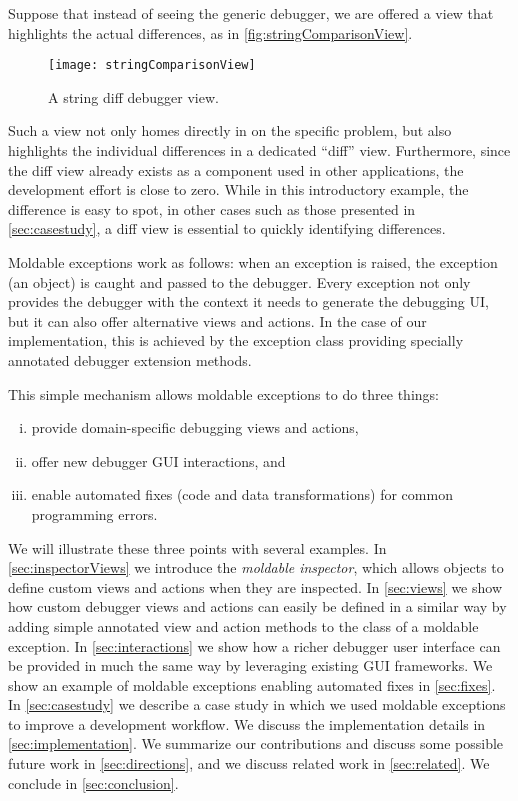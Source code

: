 \documentclass[sigplan,screen]{acmart} %
\begin{document}
Suppose that instead of seeing the generic debugger, we are offered a view that highlights the actual differences, as in \autoref{fig:stringComparisonView}.
\begin{figure}[h]
  \texttt{[image: stringComparisonView]}
  \caption{A string diff debugger view.}
  \label{fig:stringComparisonView}
\end{figure}
Such a view not only homes directly in on the specific problem, but also highlights the individual differences in a dedicated ``diff'' view.
Furthermore, since the diff view already exists as a component used in other applications, the development effort is close to zero.
While in this introductory example, the difference is easy to spot, in other cases such as those presented in \autoref{sec:casestudy}, a diff view is essential to quickly identifying differences.

Moldable exceptions work as follows: when an exception is raised, the exception (an object) is caught and passed to the debugger.
Every exception not only provides the debugger with the context it needs to generate the debugging UI, but it can also offer alternative views and actions.
In the case of our implementation, this is achieved by the exception class providing specially annotated debugger extension methods.

This simple mechanism allows moldable exceptions to do three things:
\begin{enumerate}[(i)]
	\item provide domain-specific debugging views and actions,
	\item offer new debugger GUI interactions, and
	\item enable automated fixes (code and data transformations) for common programming errors.
\end{enumerate}

We will illustrate these three points with several examples.
In \autoref{sec:inspectorViews} we introduce the \emph{moldable inspector}, which allows objects to define custom views and actions when they are inspected.
In \autoref{sec:views} we show how custom debugger views and actions can easily be defined in a similar way by adding simple annotated view and action methods to the class of a moldable exception.
In \autoref{sec:interactions} we show how a richer debugger user interface can be provided in much the same way by leveraging existing GUI frameworks.
We show an example of moldable exceptions enabling automated fixes in \autoref{sec:fixes}.
In \autoref{sec:casestudy} we describe a case study in which we used moldable exceptions to improve a development workflow.
We discuss the implementation details in \autoref{sec:implementation}.
We summarize our contributions and discuss some possible future work in \autoref{sec:directions}, and we discuss related work in \autoref{sec:related}.
We conclude in \autoref{sec:conclusion}.
\end{document}
